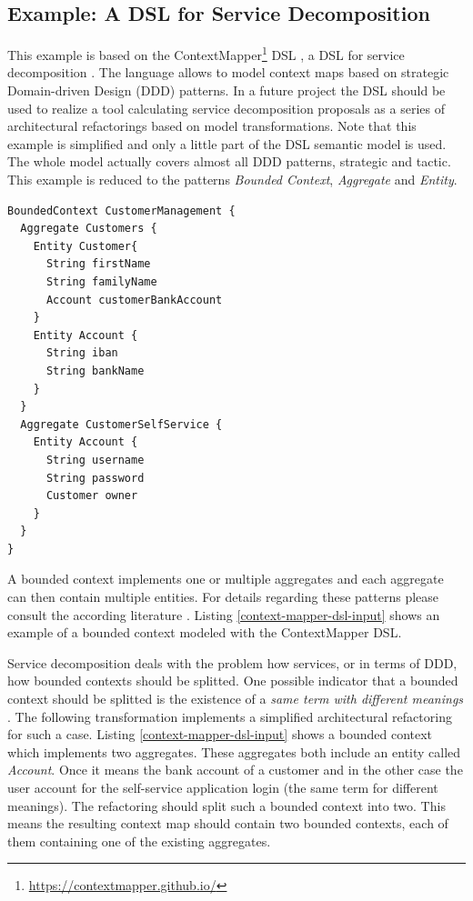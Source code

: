 \documentclass[runningheads]{llncs}
\begin{document}
\subsection{Example: A DSL for Service Decomposition}\label{example-dsl}
This example is based on the ContextMapper\footnote{\url{https://contextmapper.github.io/}} DSL \cite{context-mapper}, a DSL for service decomposition \cite{dsl-for-service-decomposition}. The language allows to model context maps based on strategic Domain-driven Design (DDD) patterns. In a future project the DSL should be used to realize a tool calculating service decomposition proposals as a series of architectural refactorings \cite{ZimmermannArchitecturalRefactorings} based on model transformations. Note that this example is simplified and only a little part of the DSL semantic model is used. The whole model actually covers almost all DDD patterns, strategic and tactic. This example is reduced to the patterns \textit{Bounded Context}, \textit{Aggregate} and \textit{Entity}. 

\begin{lstlisting}
BoundedContext CustomerManagement {
  Aggregate Customers {
    Entity Customer{
      String firstName
      String familyName
      Account customerBankAccount
    }
    Entity Account {
      String iban
      String bankName
    }
  } 
  Aggregate CustomerSelfService {
    Entity Account {
      String username
      String password
      Customer owner
    }
  }
}
\end{lstlisting}

\noindent
A bounded context implements one or multiple aggregates and each aggregate can then contain multiple entities. For details regarding these patterns please consult the according literature \cite{EvansEric2012Dd:t,Vernon:2013:IDD:2462636,millett2015patterns,dsl-for-service-decomposition}. Listing \ref{context-mapper-dsl-input} shows an example of a bounded context modeled with the ContextMapper DSL.

Service decomposition deals with the problem how services, or in terms of DDD, how bounded contexts should be splitted. One possible indicator that a bounded context should be splitted is the existence of a \textit{same term with different meanings} \cite{brandolini-infoq}. The following transformation implements a simplified architectural refactoring \cite{ZimmermannArchitecturalRefactorings} for such a case. Listing \ref{context-mapper-dsl-input} shows a bounded context which implements two aggregates. These aggregates both include an entity called \textit{Account}. Once it means the bank account of a customer and in the other case the user account for the self-service application login (the same term for different meanings). The refactoring should split such a bounded context into two. This means the resulting context map should contain two bounded contexts, each of them containing one of the existing aggregates.
\end{document}
